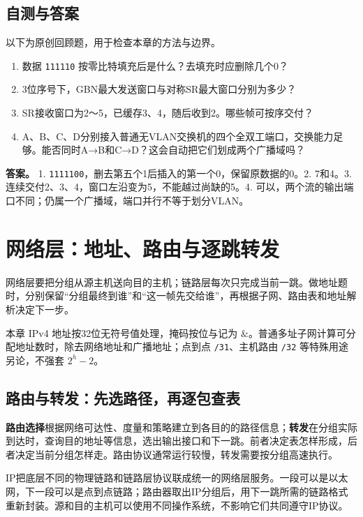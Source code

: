 \section{自测与答案}\label{cn-ch3-review}

以下为原创回顾题，用于检查本章的方法与边界。

\begin{enumerate}
\def\labelenumi{\arabic{enumi}.}
\tightlist
\item
  数据 \allowbreak{}\texttt{111110} 按零比特填充后是什么？去填充时应删除几个0？
\item
  3位序号下，GBN最大发送窗口与对称SR最大窗口分别为多少？
\item
  SR接收窗口为2～5，已缓存3、4，随后收到2。哪些帧可按序交付？
\item
  A、B、C、D分别接入普通无VLAN交换机的四个全双工端口，交换能力足够。能否同时A→B和C→D？这会自动把它们划成两个广播域吗？
\end{enumerate}

\textbf{答案。} 1. \allowbreak{}\texttt{1111100}，删去第五个1后插入的第一个0，保留原数据的0。2. 7和4。3. 连续交付2、3、4，窗口左沿变为5，不能越过尚缺的5。4. 可以，两个流的输出端口不同；仍属一个广播域，端口并行不等于划分VLAN。

\chapter{网络层：地址、路由与逐跳转发}\label{cn-ch4}

网络层要把分组从源主机送向目的主机；链路层每次只完成当前一跳。做地址题时，分别保留``分组最终到谁''和``这一帧先交给谁''，再根据子网、路由表和地址解析决定下一步。

本章 IPv4 地址按32位无符号值处理，掩码按位与记为 \(\&\)。普通多址子网计算可分配地址数时，除去网络地址和广播地址；点到点 \allowbreak{}\texttt{/31}、主机路由 \allowbreak{}\texttt{/32} 等特殊用途另论，不强套 \(2^h-2\)。

\section{路由与转发：先选路径，再逐包查表}\label{cn-04-01}

\textbf{路由选择}根据网络可达性、度量和策略建立到各目的的路径信息；\textbf{转发}在分组实际到达时，查询目的地址等信息，选出输出接口和下一跳。前者决定表怎样形成，后者决定当前分组怎样走。路由协议通常运行较慢，转发需要按分组高速执行。

IP把底层不同的物理链路和链路层协议联成统一的网络层服务。一段可以是以太网，下一段可以是点到点链路；路由器取出IP分组后，用下一跳所需的链路格式重新封装。源和目的主机可以使用不同操作系统，不影响它们共同遵守IP协议。

